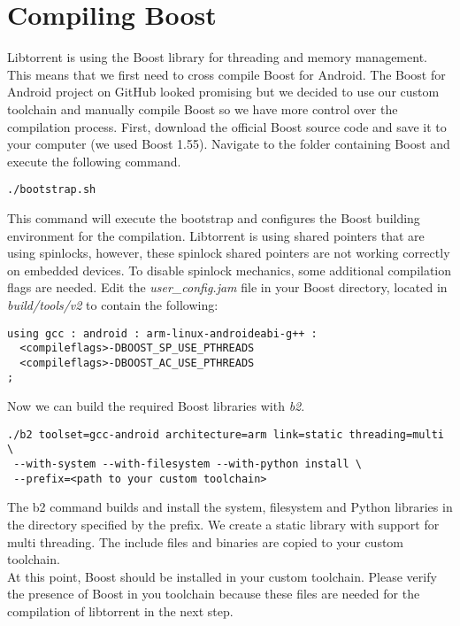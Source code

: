 \section{Compiling Boost}
	Libtorrent is using the Boost library for threading and memory management. This means that we first need to cross compile Boost for Android. The Boost for Android project on GitHub looked promising but we decided to use our custom toolchain and manually compile Boost so we have more control over the compilation process. First, download the official Boost source code and save it to your computer (we used Boost 1.55). Navigate to the folder containing Boost and execute the following command.
	\begin{lstlisting}
./bootstrap.sh
	\end{lstlisting}
	This command will execute the bootstrap and configures the Boost building environment for the compilation. Libtorrent is using shared pointers that are using spinlocks, however, these spinlock shared pointers are not working correctly on embedded devices. To disable spinlock mechanics, some additional compilation flags are needed. Edit the \emph{user\_config.jam} file in your Boost directory, located in \emph{build/tools/v2} to contain the following:
	\begin{lstlisting}
using gcc : android : arm-linux-androideabi-g++ : 
  <compileflags>-DBOOST_SP_USE_PTHREADS 
  <compileflags>-DBOOST_AC_USE_PTHREADS
;
	\end{lstlisting}
	Now we can build the required Boost libraries with \emph{b2}.
	\begin{lstlisting}
./b2 toolset=gcc-android architecture=arm link=static threading=multi \
 --with-system --with-filesystem --with-python install \
 --prefix=<path to your custom toolchain>
	\end{lstlisting}
	The b2 command builds and install the system, filesystem and Python libraries in the directory specified by the prefix. We create a static library with support for multi threading. The include files and binaries are copied to your custom toolchain.\\
	At this point, Boost should be installed in your custom toolchain. Please verify the presence of Boost in you toolchain because these files are needed for the compilation of libtorrent in the next step.